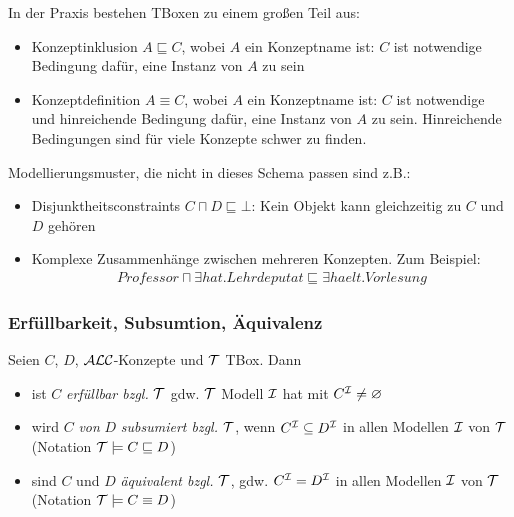 In der Praxis bestehen TBoxen zu einem großen Teil aus:

\begin{itemize}
\item Konzeptinklusion $A \sqsubseteq C$, wobei $A$ ein Konzeptname ist: $C$ ist notwendige Bedingung dafür, eine Instanz von $A$ zu sein
\item Konzeptdefinition $A \equiv C$, wobei $A$ ein Konzeptname ist: $C$ ist notwendige und hinreichende Bedingung dafür, eine Instanz von $A$ zu sein.
    Hinreichende Bedingungen sind für viele Konzepte schwer zu finden.
    \end{itemize}
Modellierungsmuster, die nicht in dieses Schema passen sind z.B.:
\begin{itemize}
\item Disjunktheitsconstraints $C \sqcap D \sqsubseteq \bot$: Kein Objekt kann gleichzeitig zu $C$ und $D$ gehören
\item Komplexe Zusammenhänge zwischen mehreren Konzepten. Zum Beispiel:
    \begin{align*}
        \mathit{Professor} \sqcap \exists \mathit{hat}.\mathit{Lehrdeputat} \sqsubseteq \exists \mathit{haelt}.\mathit{Vorlesung}
    \end{align*}
\end{itemize}

\subsubsection{Erfüllbarkeit, Subsumtion, Äquivalenz}
\label{sec:tbox-erfuellbarkeit}
\label{erfuxfcllbarkeit-subsumtion-uxe4quivalenz-1}

\begin{definition} 
Seien $C$, $D$, $\mathcal{A}\mathcal{L}\mathcal{C}$-Konzepte und $\mathcal{T}$ TBox. Dann

\begin{itemize}
  \item ist $C$ \emph{erfüllbar bzgl.} $\mathcal{T}$ gdw. $\mathcal{T}$ Modell $\mathcal{I}$ hat mit $C^{\mathcal{I}} \neq \varnothing$
  \item wird $C$ \emph{von} $D$ \emph{subsumiert bzgl.} $\mathcal{T}$, wenn $C^{\mathcal{I}} \subseteq D^{\mathcal{I}}$ in allen Modellen $\mathcal{I}$ von $\mathcal{T}$ (Notation $\mathcal{T} \models C \sqsubseteq D$)
  \item sind $C$ und $D$ \emph{äquivalent bzgl.} $\mathcal{T}$, gdw. $C^{\mathcal{I}} = D^{\mathcal{I}}$ in allen Modellen $\mathcal{I}$ von $\mathcal{T}$ (Notation $\mathcal{T} \models C \equiv D$)
\end{itemize}
\end{definition}

